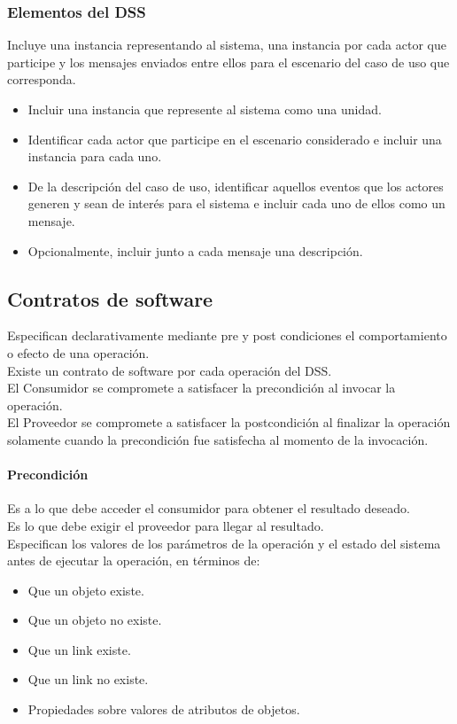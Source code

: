 \documentclass[a4paper,12pt,oneside]{report}
\begin{document}
        \subsubsection{Elementos del DSS}
          Incluye una instancia representando al sistema, una instancia por cada actor
          que participe y los mensajes enviados entre ellos para el escenario del caso de
          uso que corresponda.
          \begin{itemize}
            \item Incluir una instancia que represente al sistema como una unidad.
            \item Identificar cada actor que participe en el escenario considerado e
                  incluir una instancia para cada uno.
            \item De la descripci\'on del caso de uso, identificar aquellos eventos que
                  los actores generen y sean de inter\'es para el sistema e incluir cada uno
                  de ellos como un mensaje.
            \item Opcionalmente, incluir junto a cada mensaje una descripci\'on.
          \end{itemize}

      \subsection{Contratos de software}
        Especifican declarativamente mediante pre y post condiciones el comportamiento o
        efecto de una operaci\'on.\\
        Existe un contrato de software por cada operaci\'on del DSS.\\
        El Consumidor se compromete a satisfacer la precondici\'on al invocar la operaci\'on.\\
        El Proveedor se compromete a satisfacer la postcondici\'on al finalizar la operaci\'on
        solamente cuando la precondici\'on fue satisfecha al momento de la invocaci\'on.

        \paragraph{Precondici\'on}
          Es a lo que debe acceder el consumidor para obtener el resultado deseado.\\
          Es lo que debe exigir el proveedor para llegar al resultado.\\
          Especifican los valores de los par\'ametros de la operaci\'on y el estado
          del sistema antes de ejecutar la operaci\'on, en t\'erminos de:
            \begin{itemize}
              \item Que un objeto existe.
              \item Que un objeto no existe.
              \item Que un link existe.
              \item Que un link no existe.
              \item Propiedades sobre valores de atributos de objetos.
            \end{itemize}
\end{document}
